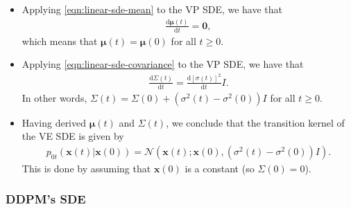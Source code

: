 \documentclass[10pt]{article}
\newcommand{\dee}{\mathrm{d}}
\newcommand{\ve}[1]{\mathbf{#1}}
\newcommand{\ves}[1]{\boldsymbol{#1}}
\newcommand{\mcal}[1]{\mathcal{#1}}
\begin{document}
\begin{itemize}
  \item Applying \eqref{eqn:linear-sde-mean} to the VP SDE, we have that
  \begin{align*}
    \frac{\dee \ves{\mu}(t)}{\dee t} = \ve{0},
  \end{align*}
  which means that $\ves{\mu}(t) = \ves{\mu}(0)$ for all $t \geq 0$.

  \item Applying \eqref{eqn:linear-sde-covariance} to the VP SDE, we have that
  \begin{align*}
    \frac{\dee \Sigma(t)}{\dee t} = \frac{\dee [\sigma(t)]^2}{\dee t} I.
  \end{align*}
  In other words, $\Sigma(t) = \Sigma(0) +  (\sigma^2(t) - \sigma^2(0))I$ for all $t \geq 0$.
 
  \item Having derived $\ves{\mu}(t)$ and $\Sigma(t)$, we conclude that the transition kernel of the VE SDE is given by
  \begin{align*}
    p_{0t}(\ve{x}(t)|\ve{x}(0)) = \mcal{N}(\ve{x}(t);\ve{x}(0), (\sigma^2(t)- \sigma^2(0)) I).
  \end{align*}
  This is done by assuming that $\ve{x}(0)$ is a constant (so $\Sigma(0) = 0$).
\end{itemize}

\subsubsection{DDPM's SDE}
\end{document}
